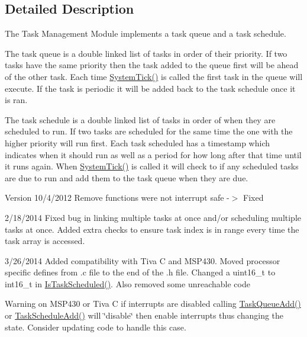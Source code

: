 \subsection{Detailed Description}
The Task Management Module implements a task queue and a task schedule. 

The task queue is a double linked list of tasks in order of their priority. If two tasks have the same priority then the task added to the queue first will be ahead of the other task. Each time \hyperlink{group__task_gafd2aa563748d1ede229e5867753ead5d}{System\+Tick()} is called the first task in the queue will execute. If the task is periodic it will be added back to the task schedule once it is ran.

The task schedule is a double linked list of tasks in order of when they are scheduled to run. If two tasks are scheduled for the same time the one with the higher priority will run first. Each task scheduled has a timestamp which indicates when it should run as well as a period for how long after that time until it runs again. When \hyperlink{group__task_gafd2aa563748d1ede229e5867753ead5d}{System\+Tick()} is called it will check to if any scheduled tasks are due to run and add them to the task queue when they are due.

\begin{DoxyVersion}{Version}
10/4/2012 Remove functions were not interrupt safe -\/$>$ Fixed

2/18/2014 Fixed bug in linking multiple tasks at once and/or scheduling multiple tasks at once. Added extra checks to ensure task index is in range every time the task array is accessed.

3/26/2014 Added compatibility with Tiva C and M\+S\+P430. Moved processor specific defines from .c file to the end of the .h file. Changed a uint16\+\_\+t to int16\+\_\+t in \hyperlink{group__task_gaee42fba49f1e2560a2fb3d2debb6eab9}{Is\+Task\+Scheduled()}. Also removed some unreachable code
\end{DoxyVersion}
\begin{DoxyWarning}{Warning}
on M\+S\+P430 or Tiva C if interrupts are disabled calling \hyperlink{group__task_ga8199744ecf98f4adfc5c132b82f7bca0}{Task\+Queue\+Add()} or \hyperlink{group__task_ga0325ea2e7cf4b65adade783e27cbb58e}{Task\+Schedule\+Add()} will \char`\"{}disable\char`\"{} then enable interrupts thus changing the state. Consider updating code to handle this case. 
\end{DoxyWarning}


